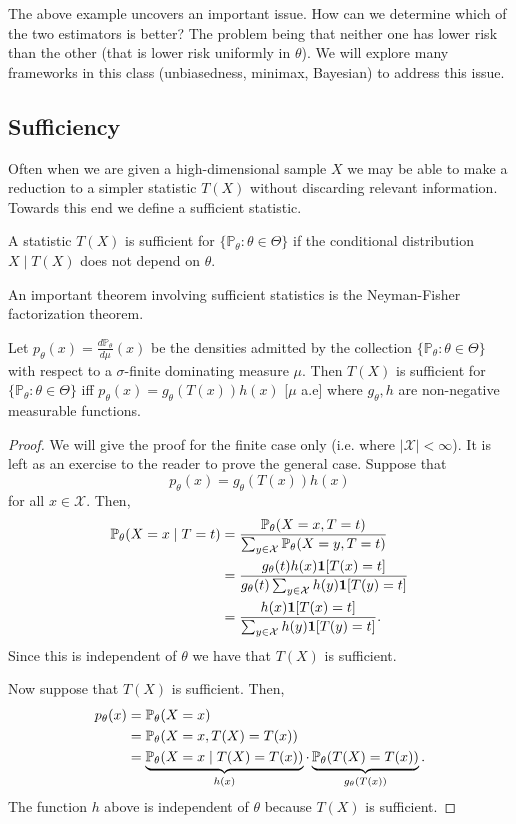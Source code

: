 \noindent The above example uncovers an important issue. How can we determine which of the two estimators is better? The problem being that neither one has lower risk than the other (that is lower risk uniformly in $\theta$). We will explore many frameworks in this class (unbiasedness, minimax, Bayesian) to address this issue.

\subsection{Sufficiency}
Often when we are given a high-dimensional sample $X$ we may be able to make a reduction to a simpler statistic $T(X)$ without discarding relevant information. Towards this end we define a sufficient statistic.

\begin{definition}
	A statistic $T(X)$ is sufficient for $\{\mathbb P_\theta : \theta \in \Theta\}$ if the conditional distribution $X \mid T(X)$ does not depend on $\theta$. 
\end{definition} 

\noindent An important theorem involving sufficient statistics is the Neyman-Fisher factorization theorem. 

\begin{theorem}
	Let $p_\theta(x) = \frac{d\mathbb P_\theta}{d\mu}(x)$ be the densities admitted by the collection $\{\mathbb P_\theta : \theta \in \Theta\}$ with respect to a $\sigma$-finite dominating measure $\mu$. Then $T(X)$ is sufficient for $\{\mathbb P_\theta : \theta \in \Theta\}$ iff $p_\theta(x) = g_\theta(T(x)) h(x)$ [$\mu$ a.e] where $g_\theta, h$ are non-negative measurable functions.
\end{theorem} 

\begin{proof}
	We will give the proof for the finite case only (i.e. where $|\mathcal X| < \infty$). It is left as an exercise to the reader to prove the general case. Suppose that \[
	p_\theta(x) = g_\theta(T(x)) h(x) 
	\] for all $x \in \mathcal X$. Then,
	\begin{align*}
	\mathbb{P}_\theta(X=x\mid T=t)
	&= \frac{\mathbb{P}_\theta(X=x,T=t)}
	        {\sum_{y\in\mathcal X}\mathbb{P}_\theta(X=y,T=t)} \\
	&= \frac{g_\theta(t)h(x)\mathbf 1[T(x)=t]}
	        {g_\theta(t)\sum_{y\in\mathcal X}h(y)\mathbf 1[T(y)=t]} \\
	&= \frac{h(x)\mathbf 1[T(x)=t]}
	        {\sum_{y\in\mathcal X}h(y)\mathbf 1[T(y)=t]} .
	\end{align*}
	Since this is independent of $\theta$ we have that $T(X)$ is sufficient. 
	
	\medskip \noindent Now suppose that $T(X)$ is sufficient. Then,
	\begin{align*}
	p_\theta(x)
	&= \mathbb{P}_\theta(X=x) \\
	&= \mathbb{P}_\theta(X=x,T(X)=T(x)) \\
	&= \underbrace{\mathbb{P}_\theta(X=x\mid T(X)=T(x))}_{h(x)}
	   \cdot
	   \underbrace{\mathbb{P}_\theta(T(X)=T(x))}_{g_\theta(T(x))}.
	\end{align*}
	The function $h$ above is independent of $\theta$ because $T(X)$ is sufficient.
\end{proof}

